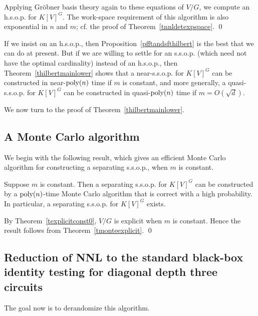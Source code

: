 \documentclass[11pt]{article}
\begin{document}
Applying Gr\"obner basis theory \cite{mayr2} again  to these equations of $V/G$,
we compute  an h.s.o.p. for $K[V]^G$.
The work-space requirement of this algorithm is also exponential in $n$ and $m$; cf. the proof of Theorem~\ref{tnnldetexpspace}.
\qed



If we insist on an h.s.o.p., then Proposition~\ref{pfftandsfthilbert} is the best that we can do at present. 
But if we are willing to settle for an s.s.o.p. (which need not have the optimal cardinality) instead of an h.s.o.p.,  then
Theorem~\ref{thilbertmainlower} shows   that a near-s.s.o.p. for $K[V]^G$ can be constructed in
near-${\mbox {poly}}(n)$ time if $m$ is constant, and  more generally, 
a quasi-s.s.o.p. for $K[V]^G$ can be constructed in
quasi-${\mbox {poly}}(n)$ time if $m=O(\sqrt{d})$.

We now turn to the  proof of Theorem~\ref{thilbertmainlower}.

\subsection{A Monte Carlo algorithm} 
We begin with the following result, which 
gives an efficient  Monte Carlo algorithm for constructing
a separating s.s.o.p.,  when $m$ is constant.

\begin{theorem} \label{tmontecarloconstant}
Suppose $m$ is constant. 
Then a separating   s.s.o.p. 
for $K[V]^G$ can be constructed by a ${\mbox {poly}}(n)$-time Monte Carlo algorithm that is correct with a high probability.
In particular, a separating  s.s.o.p. for $K[V]^G$ exists.
\end{theorem} 
\proof By Theorem~\ref{texplicitconst0}, 
$V/G$ is explicit when $m$  is constant. Hence the result follows from  Theorem~\ref{tmonteexplicit}.
\qed 



\subsection{Reduction of  NNL to the  standard black-box identity testing for diagonal depth three circuits}
The goal now  is to derandomize this algorithm. 
\end{document}
